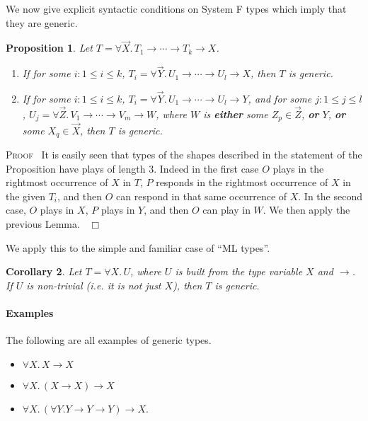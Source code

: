 \documentclass[a4paper,11pt]{article}
\newtheorem{proposition}{Proposition}[section]
\newtheorem{corollary}[proposition]{Corollary}
\newenvironment{proof}{\textsc{Proof}\ }{$\;\; \Box$}
\begin{document}
We now give explicit syntactic conditions on System F types which
imply that they are generic.

\begin{proposition}
Let $T = \forall \vec{X}. \, T_1 \rightarrow \cdots \rightarrow T_k
\rightarrow X$.
\begin{enumerate}
\item If for some $i: 1 \leq i \leq k$, $T_i = \forall \vec{Y}. \, U_1 \rightarrow \cdots \rightarrow U_l
\rightarrow X$, then $T$ is generic.
\item If for some $i: 1 \leq i \leq k$, $T_i = \forall \vec{Y}. \, U_1 \rightarrow \cdots \rightarrow U_l
\rightarrow Y$, and for some $j: 1 \leq j \leq l$, $U_j = \forall \vec{Z}. \, V_1 \rightarrow \cdots \rightarrow V_m
\rightarrow W$, where $W$ is \textbf{either} some $Z_p \in \vec{Z}$,
\textbf{or} $Y$, \textbf{or} some $X_q
\in \vec{X}$, then $T$ is generic.
\end{enumerate}
\end{proposition}
\begin{proof}
It is easily seen that types of the shapes described in the statement
of the Proposition have
plays of length 3. Indeed in the first case $O$ plays in the rightmost
occurrence of $X$ in $T$, $P$ responds in the rightmost occurrence of $X$ in
the given $T_i$, and then $O$ can respond in that same occurrence of
$X$.
In the second case, $O$ plays in $X$, $P$ plays in $Y$, and then $O$
can play in $W$. We then apply the previous Lemma.
\end{proof}

\noindent We apply this to the simple and familiar case of ``ML types''.
\begin{corollary}
Let $T = \forall X. \, U$, where $U$ is built from the type variable
$X$ and $\rightarrow$. If $U$ is non-trivial (i.e. it is not just
$X$), then $T$ is generic.
\end{corollary}

\paragraph{Examples}
The following are all examples of generic types.
\begin{itemize}
\item $\forall X. \, X \rightarrow X$
\item $\forall X. \, (X \rightarrow X) \rightarrow X$
\item $\forall X. \, (\forall Y. Y \rightarrow Y \rightarrow Y)
  \rightarrow X$.
\end{itemize}
\end{document}

